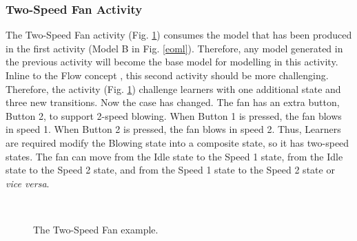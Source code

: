 \documentclass[conference]{IEEEtran}
\begin{document}
\subsubsection{Two-Speed Fan Activity}
The Two-Speed Fan activity (Fig. \ref{example-02}) consumes the model that has been produced in the first activity (Model B in Fig. \ref{eoml}). Therefore, any model generated in the previous activity will become the base model for modelling in this activity. Inline to the Flow concept \cite{csikszentmihalyi2014toward}, this second activity should be more challenging. Therefore, the activity (Fig. \ref{example-02}) challenge learners with one additional state and three new transitions. Now the case has changed. The fan has an extra button, Button 2, to support 2-speed blowing. When Button 1 is pressed, the fan blows in speed 1. When Button 2 is pressed, the fan blows in speed 2. Thus, Learners are required modify the Blowing state into a composite state, so it has two-speed states. The fan can move from the Idle state to the Speed 1 state, from the Idle state to the Speed 2 state, and from the Speed 1 state to the Speed 2 state or \textit{vice versa}.

\begin{figure}[!t]
    \centering
    \\
	\caption{The Two-Speed Fan example.}
    \label{example-02}
\end{figure}
\end{document}
